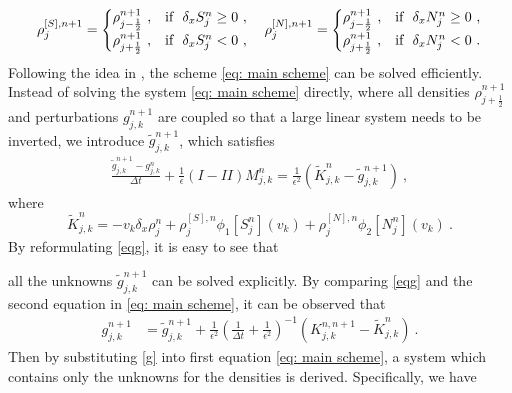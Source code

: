 \documentclass[11pt,twoside]{article}
\theoremstyle{nonumberplain}
\begin{document}
{
\[
\rho^{[S],n+1}_{j}=\begin{cases}
     \rho^{n+1}_{j-\frac{1}{2}}\ ,  &\textnormal{if}\ \  \delta_x S_{j}^n\geq 0\ ,\\
    \rho^{n+1}_{j+\frac{1}{2}}\ , &\textnormal{if}\ \ \delta_x S_{j}^n< 0\ ,
\end{cases}
\quad \rho^{[N],n+1}_{j}=\begin{cases}
     \rho^{n+1}_{j-\frac{1}{2}}\ , & \textnormal{if}\ \  \delta_x N_{j}^n\geq 0\ ,\\
    \rho^{n+1}_{j+\frac{1}{2}}\ , & \textnormal{if}\ \ \delta_x N_{j}^n< 0\ .
    \end{cases}
\]
Following the idea in \cite{lemou2008new}, the scheme \eqref{eq: main scheme} can be solved efficiently. Instead of solving the system \eqref{eq: main scheme} directly, where all densities $\rho_{j+\frac{1}{2}}^{n+1}$ and perturbations $g_{j,k}^{n+1}$ are coupled so that a large linear system needs to be inverted, we introduce $\tilde{g}_{j,k}^{n+1}$, which satisfies
\begin{eqnarray}\label{eqg}
    \frac{\tilde{g}_{j,k}^{n+1}-g_{j,k}^n}{\Delta t}+\frac{1}{\epsilon}(I-II)M_{j,k}^n=\frac{1}{\epsilon^2}(\widetilde{K}_{j,k}^{n}-\tilde{g}_{j,k}^{n+1})\ ,
\end{eqnarray}
where
$$
\widetilde{K}_{j,k}^{n}=-v_k\delta_x\rho_{j}^{n}+\rho^{[S],n}_{j}\phi_1[S_{j}^n](v_k)+\rho^{[N],n}_{j}\phi_2[N_{j}^n](v_k)\ .
$$
By reformulating \eqref{eqg}, it is easy to see that

 all the unknowns $\tilde{g}_{j,k}^{n+1}$ can be solved explicitly. By comparing \eqref{eqg} and the second equation in \eqref{eq: main scheme}, it can be observed that 
\begin{align}\label{g}
    g_{j,k}^{n+1}
    &=\tilde{g}_{j,k}^{n+1}+\frac{1}{\epsilon^2}\left(\frac{1}{\Delta t}+\frac{1}{\epsilon^2}\right)^{-1}\left( K_{j,k}^{n,n+1}-\widetilde{K}_{j,k}^n \right)\ .
\end{align}
Then by substituting \eqref{g} into first equation \eqref{eq: main scheme}, a system which contains only the unknowns for the densities is derived. Specifically, we have  
}
\end{document}
